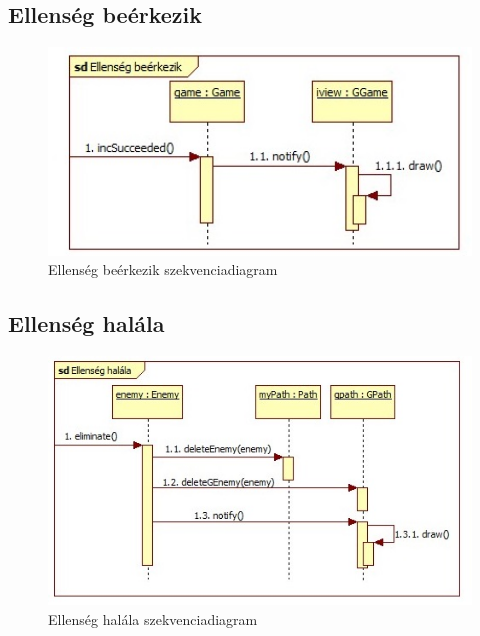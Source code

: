 \subsection{Ellenség beérkezik}
\begin{figure}[H]
\begin{center}
\includegraphics[width=17cm]{chapters/chapter11/images/Ellenseg_beerkezik.jpg}
\caption{Ellenség beérkezik szekvenciadiagram}
\label{fig:Ellenseg_beerkezik}
\end{center}
\end{figure}

\subsection{Ellenség halála}
\begin{figure}[H]
\begin{center}
\includegraphics[width=17cm]{chapters/chapter11/images/Ellenseg_halala.jpg}
\caption{Ellenség halála szekvenciadiagram}
\label{fig:Ellenseg_halala}
\end{center}
\end{figure}


